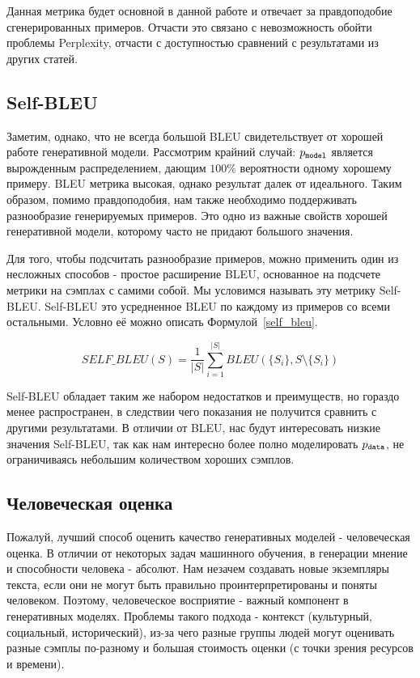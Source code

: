 \documentclass{spbau-diploma}
\begin{document}
Данная метрика будет основной в данной работе и отвечает за правдоподобие 
сгенерированных примеров. Отчасти это связано с невозможность обойти проблемы
Perplexity, отчасти с доступностью сравнений с результатами из других статей.

\subsection{Self-BLEU}
Заметим, однако, что не всегда большой BLEU свидетельствует от хорошей работе
генеративной модели. Рассмотрим крайний случай: $p_{\texttt{model}}$ является вырожденным
распределением, дающим $100\%$ вероятности одному хорошему примеру. BLEU метрика
высокая, однако результат далек от идеального. Таким образом, помимо 
правдоподобия, нам также необходимо поддерживать разнообразие генерируемых 
примеров. Это одно из важные свойств хорошей генеративной модели, которому
часто не придают большого значения.

Для того, чтобы подсчитать разнообразие примеров, можно применить один из 
несложных способов - простое расширение BLEU, основанное на подсчете метрики на 
сэмплах с самими собой. 
Мы условимся называть эту метрику Self-BLEU. Self-BLEU это усредненное BLEU по 
каждому из примеров со всеми остальными. Условно её можно описать 
Формулой~\ref{self_bleu}.

\begin{equation}
\label{self_bleu}
SELF\_BLEU(S) = \frac{1}{|S|} \sum\limits^{|S|}_{i=1}{BLEU(\{S_i\}, S \setminus \{S_i\})}
\end{equation}

Self-BLEU обладает таким же набором недостатков и преимуществ, но гораздо менее
распространен, в следствии чего показания не получится сравнить с другими 
результатами. В отличии от BLEU, нас будут интересовать низкие значения 
Self-BLEU, так как нам интересно более полно моделировать $p_{\texttt{data}}$, не 
ограничиваясь небольшим количеством хороших сэмплов.

\subsection{Человеческая оценка}
Пожалуй, лучший способ оценить качество генеративных моделей - человеческая 
оценка.
В отличии от некоторых задач машинного обучения, в генерации мнение и 
способности человека - абсолют. Нам незачем создавать новые экземпляры текста, 
если они не могут быть правильно проинтерпретированы и поняты человеком. 
Поэтому, человеческое восприятие - важный компонент в генеративных моделях. 
Проблемы такого подхода - контекст (культурный, социальный, исторический), из-за
чего разные группы людей могут оценивать разные сэмплы по-разному и большая
стоимость оценки (с точки зрения ресурсов и времени).
\end{document}

